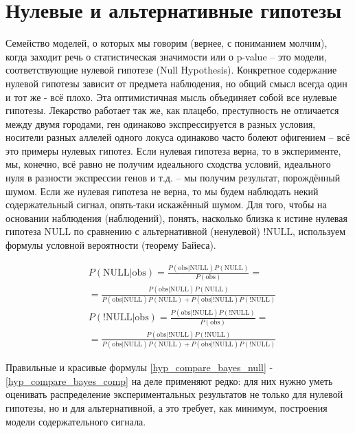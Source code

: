 \documentclass{book}
\begin{document}
\section*{Нулевые и альтернативные гипотезы}

Семейство моделей, о которых мы говорим (вернее, с пониманием молчим), когда заходит речь о статистическая значимости или о p-value -- это модели, соответствующие нулевой гипотезе (Null Hypothesis). Конкретное содержание нулевой гипотезы зависит от предмета наблюдения, но общий смысл всегда один и тот же - всё плохо. Эта оптимистичная мысль объединяет собой все нулевые гипотезы. Лекарство работает так же, как плацебо, преступность не отличается между двумя городами, ген одинаково экспрессируется в разных условия, носители разных аллелей одного локуса одинаково часто болеют офигением -- всё это примеры нулевых гипотез. Если нулевая гипотеза верна, то в эксперименте, мы, конечно, всё равно не получим идеального сходства условий, идеального нуля в разности экспрессии генов и т.д. -- мы получим результат, порождённый шумом. Если же нулевая гипотеза не верна, то мы будем наблюдать некий содержательный сигнал, опять-таки искажённый шумом. Для того, чтобы на основании наблюдения (наблюдений), понять, насколько близка к истине нулевая гипотеза $\text{NULL}$ по сравнению с альтернативной (ненулевой) $\text{!NULL}$, используем формулы условной вероятности (теорему Байеса). 

\begin{align}\label{hyp_compare_bayes_null}
   &P\left(\text{NULL|obs}\right)=
   \frac{P\left(\text{obs|NULL}\right) P\left(\text{NULL}\right)}{P\left(\text{obs}\right)} = \nonumber \\
   &=\frac{P\left(\text{obs|NULL}\right) P\left(\text{NULL}\right)}{P\left(\text{obs|NULL}\right) P\left(\text{NULL}\right)+P\left(\text{obs|!NULL}\right) P\left(\text{!NULL}\right)} 
\end{align}
\begin{align}\label{hyp_compare_bayes_not_null}
   &P\left(\text{!NULL|obs}\right)=
   \frac{P\left(\text{obs|!NULL}\right) P\left(\text{!NULL}\right)}{P\left(\text{obs}\right)} = \nonumber \\
   &=\frac{P\left(\text{obs|!NULL}\right) P\left(\text{!NULL}\right)}{P\left(\text{obs|NULL}\right) P\left(\text{NULL}\right)+P\left(\text{obs|!NULL}\right) P\left(\text{!NULL}\right)}
\end{align}

Правильные и красивые формулы \eqref{hyp_compare_bayes_null} - \eqref{hyp_compare_bayes_comp} на деле применяют редко: для них нужно уметь оценивать распределение экспериментальных результатов не только для нулевой гипотезы, но и для альтернативной, а это требует, как минимум, построения модели содержательного сигнала. 
\end{document}
